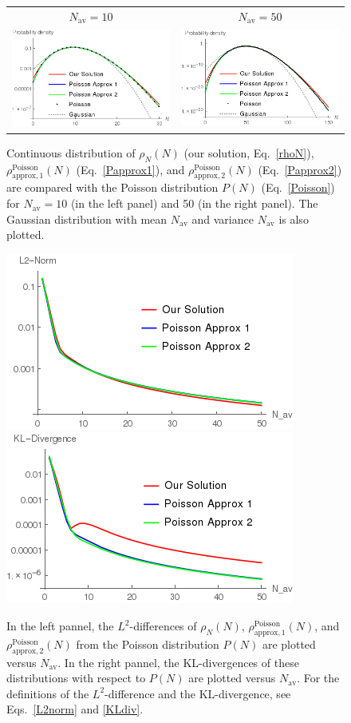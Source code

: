 \documentclass{article}
\newcommand{\Nav}{{N_\mathrm{av}}}
\begin{document}
\begin{figure}
\begin{center}
\begin{tabular}{cc}
$\Nav=10$ & $\Nav=50$ \\
\includegraphics[width=0.4\linewidth]{fig4/rho_Nav10.png} &
\includegraphics[width=0.4\linewidth]{fig4/rho_Nav50.png}
\end{tabular}
\caption{\label{fig_rho}Continuous distribution of $\rho_N(N)$ (our solution, Eq.~\eqref{rhoN}), $\rho^\mathrm{Poisson}_\mathrm{approx,1}(N)$ (Eq.~\eqref{Papprox1}), and $\rho^\mathrm{Poisson}_\mathrm{approx,2}(N)$ (Eq.~\eqref{Papprox2}) are compared with the Poisson distribution $P(N)$ (Eq.~\eqref{Poisson}) for $\Nav=10$ (in the left panel) and 50 (in the right panel). The Gaussian distribution with mean $\Nav$ and variance $\Nav$ is also plotted.}
\end{center}
\end{figure}
\begin{figure}
\begin{center}
\includegraphics[width=0.4\linewidth]{fig4/L2norm.png}
\includegraphics[width=0.4\linewidth]{fig4/KLdiv.png}
\caption{\label{fig_L2norm_KLdiv}In the left pannel, the $L^2$-differences of $\rho_N(N)$, $\rho^\mathrm{Poisson}_\mathrm{approx,1}(N)$, and $\rho^\mathrm{Poisson}_\mathrm{approx,2}(N)$ from the Poisson distribution $P(N)$ are plotted versus $\Nav$. In the right pannel, the KL-divergences of these distributions with respect to $P(N)$ are plotted versus $\Nav$. For the definitions of the $L^2$-difference and the KL-divergence, see Eqs.~\eqref{L2norm} and \eqref{KLdiv}.}
\end{center}
\end{figure}
\end{document}
